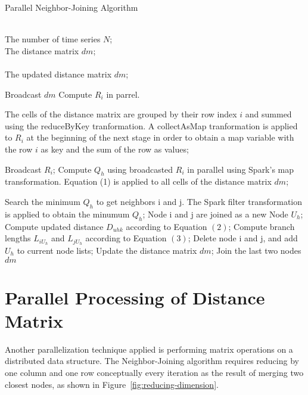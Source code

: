 \begin{algorithm}[htb] 
	\caption{Parallel Neighbor-Joining Algorithm} 
	\label{alg:pnj} 
	\begin{algorithmic}[1] %
		\REQUIRE ~~\\ %
		The number of time series $N$; \\
		The distance matrix $dm$; \\
		\ENSURE ~~\\ %
		The updated distance matrix $dm$;
		
		
		\STATE Broadcast $dm$
		\STATE Compute $R_i$ in parrel. 
		
		The cells of the distance matrix are grouped by their row index $i$ and summed using the \textsf{reduceByKey} tranformation. A \textsf{collectAsMap} tranformation is applied to $R_i$ at the beginning of the next stage in order to obtain a \textsf{map} variable with the row $i$ as key and the sum of the row as values;
		
		
		\STATE Broadcast $R_i$;
		\STATE  Compute $Q_{h}$ using broadcasted $R_i$ in parallel using Spark's \textsf{map} transformation. Equation (1) is applied to all cells of the distance matrix $dm$;
		
		\ENDFOR
		\STATE Search the minimum $Q_{h}$ to get neighbors i and j. The Spark \textsf{filter} transformation is applied to obtain the minumum $Q_{h}$;
		\STATE Node i and j are joined as a new Node $U_h$;
		\STATE Compute updated distance $D_{uhk}$ according to Equation $(2)$;
		\STATE Compute branch lengths $L_{iU_h}$ and $L_{jU_h}$ according to Equation $(3)$;
		\STATE Delete node i and j, and add $U_h$ to current node lists;
		\STATE Update the distance matrix $dm$;		
		\ENDFOR
		\STATE Join the last two nodes
		\RETURN $dm$
		
	\end{algorithmic}
\end{algorithm}


\section{Parallel Processing of Distance Matrix} 
Another parallelization technique applied is performing matrix operations on a distributed data structure. The Neighbor-Joining algorithm requires reducing by one column and one row conceptually every iteration as the result of merging two closest nodes, as shown in Figure~\ref{fig:reducing-dimension}. 

